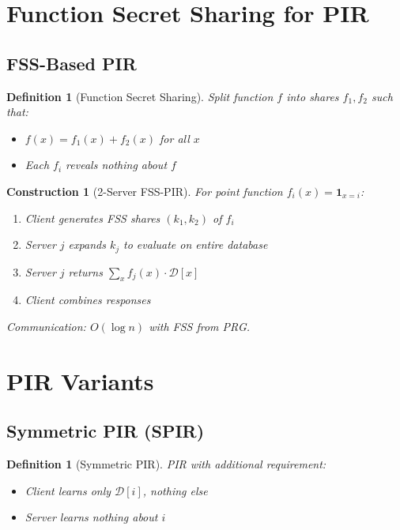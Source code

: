 \documentclass[11pt,final,hidelinks]{article}
\newcommand{\DB}{\mathcal{D}}
\newtheorem{definition}[theorem]{Definition}
\newtheorem{construction}[theorem]{Construction}
\begin{document}
\section{Function Secret Sharing for PIR}

\subsection{FSS-Based PIR}

\begin{definition}[Function Secret Sharing]
Split function $f$ into shares $f_1, f_2$ such that:
\begin{itemize}
    \item $f(x) = f_1(x) + f_2(x)$ for all $x$
    \item Each $f_i$ reveals nothing about $f$
\end{itemize}
\end{definition}

\begin{construction}[2-Server FSS-PIR]
For point function $f_i(x) = \mathbf{1}_{x = i}$:
\begin{enumerate}
    \item Client generates FSS shares $(k_1, k_2)$ of $f_i$
    \item Server $j$ expands $k_j$ to evaluate on entire database
    \item Server $j$ returns $\sum_x f_j(x) \cdot \DB[x]$
    \item Client combines responses
\end{enumerate}
Communication: $O(\log n)$ with FSS from PRG.
\end{construction}

\section{PIR Variants}

\subsection{Symmetric PIR (SPIR)}

\begin{definition}[Symmetric PIR]
PIR with additional requirement:
\begin{itemize}
    \item Client learns only $\DB[i]$, nothing else
    \item Server learns nothing about $i$
\end{itemize}
\end{definition}
\end{document}
